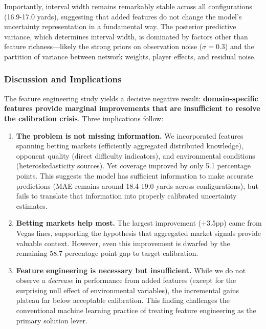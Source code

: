 Importantly, interval width remains remarkably stable across all configurations (16.9-17.0 yards), suggesting that added features do not change the model's uncertainty representation in a fundamental way. The posterior predictive variance, which determines interval width, is dominated by factors other than feature richness—likely the strong priors on observation noise ($\sigma = 0.3$) and the partition of variance between network weights, player effects, and residual noise.

\subsubsection{Discussion and Implications}

The feature engineering study yields a decisive negative result: \textbf{domain-specific features provide marginal improvements that are insufficient to resolve the calibration crisis}. Three implications follow:

\begin{enumerate}
    \item \textbf{The problem is not missing information.} We incorporated features spanning betting markets (efficiently aggregated distributed knowledge), opponent quality (direct difficulty indicators), and environmental conditions (heteroskedasticity sources). Yet coverage improved by only 5.1 percentage points. This suggests the model has sufficient information to make accurate predictions (MAE remains around 18.4-19.0 yards across configurations), but fails to translate that information into properly calibrated uncertainty estimates.

    \item \textbf{Betting markets help most.} The largest improvement (+3.5pp) came from Vegas lines, supporting the hypothesis that aggregated market signals provide valuable context. However, even this improvement is dwarfed by the remaining 58.7 percentage point gap to target calibration.

    \item \textbf{Feature engineering is necessary but insufficient.} While we do not observe a \textit{decrease} in performance from added features (except for the surprising null effect of environmental variables), the incremental gains plateau far below acceptable calibration. This finding challenges the conventional machine learning practice of treating feature engineering as the primary solution lever.
\end{enumerate}


